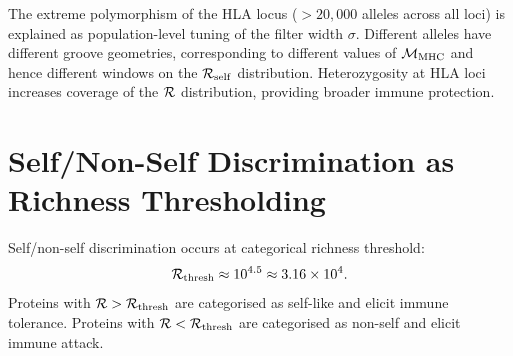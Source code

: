 \begin{corollary}
\label{cor:allelic_diversity}
The extreme polymorphism of the HLA locus ($> 20{,}000$ alleles across all
loci) is explained as population-level tuning of the filter width $\sigma$.
Different alleles have different groove geometries, corresponding to different
values of $\mathcal{M}_{\mathrm{MHC}}$ and hence different windows on the
$\mathcal{R}_{\mathrm{self}}$ distribution. Heterozygosity at HLA loci increases
coverage of the $\mathcal{R}$ distribution, providing broader immune protection.
\end{corollary}

\section{Self/Non-Self Discrimination as Richness Thresholding}
\label{sec:self_nonself}

\begin{theorem}
\label{thm:self_nonself}
Self/non-self discrimination occurs at categorical richness threshold:
\begin{equation}
  \mathcal{R}_{\mathrm{thresh}} \approx 10^{4.5} \approx 3.16 \times 10^4.
  \label{eq:self_thresh}
\end{equation}
Proteins with $\mathcal{R} > \mathcal{R}_{\mathrm{thresh}}$ are categorised as self-like
and elicit immune tolerance. Proteins with $\mathcal{R} < \mathcal{R}_{\mathrm{thresh}}$
are categorised as non-self and elicit immune attack.
\end{theorem}

